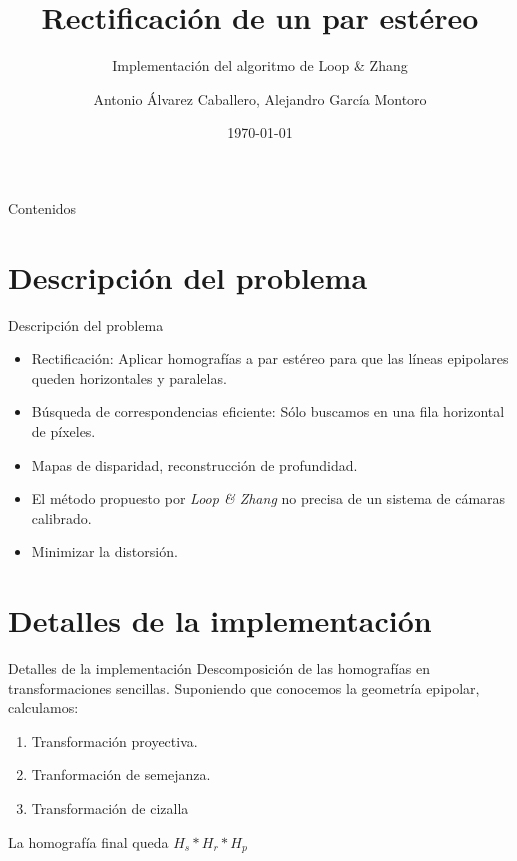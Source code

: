 \documentclass[aspectratio=169,14pt,spanish]{beamer}
\title[Rectificación]{Rectificación de un par estéreo}
\subtitle[Implementación de Loop Zhang]{Implementación del algoritmo de Loop \& Zhang}
\author[A. A. Caballero, A. G. Montoro]{Antonio Álvarez Caballero, Alejandro García Montoro}
\institute[UGR]{Universidad de Granada}
\date{\today}
\begin{document}
    \titlepage

    \begin{frame}[t]{Contenidos}
        \tableofcontents
    \end{frame}

    \section{Descripción del problema}

    \begin{frame}{Descripción del problema}{}

        \begin{itemize}
            \item Rectificación: Aplicar homografías a par estéreo para que las líneas
              epipolares queden horizontales y paralelas.
            \item Búsqueda de correspondencias eficiente: Sólo buscamos en una fila
              horizontal de píxeles.
            \item Mapas de disparidad, reconstrucción de profundidad.
            \item El método propuesto por \emph{Loop \& Zhang} no precisa de un sistema
              de cámaras calibrado.
            \item Minimizar la distorsión.
        \end{itemize}

    \end{frame}

    \section{Detalles de la implementación}

    \begin{frame}{Detalles de la implementación}{}
      Descomposición de las homografías en transformaciones sencillas.
      Suponiendo que conocemos la geometría epipolar, calculamos:
        \begin{enumerate}
            \item Transformación proyectiva.
            \item Tranformación de semejanza.
            \item Transformación de cizalla
        \end{enumerate}

        La homografía final queda $H_s * H_r * H_p$

    \end{frame}
\end{document}
